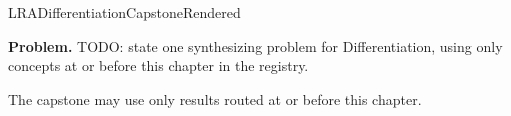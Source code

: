 \ifcsname LRADifferentiationCapstoneRendered\endcsname
\else
\expandafter\gdef\csname LRADifferentiationCapstoneRendered\endcsname{}

\newpage
{}
\label{cap:differentiation}

\begin{tcolorbox}[
  colback=gray!6,
  colframe=gray!40,
  arc=2pt,
  left=8pt, right=8pt, top=6pt, bottom=6pt,
  title={\small\textbf{Capstone Problem}},
  fonttitle=\small\bfseries
]
\textbf{Problem.}
TODO: state one synthesizing problem for Differentiation, using only concepts at or
before this chapter in the registry.
\end{tcolorbox}

\begin{remark*}
The capstone may use only results routed at or before this chapter.
\end{remark*}

\clearpage
\fi
